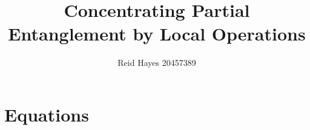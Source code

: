 \documentclass[12pt,letterpaper]{article}
\author{Reid Hayes 20457389}
\title{Concentrating Partial Entanglement by Local Operations}
\begin{document}
\maketitle
\section{Equations}

\end{document}
